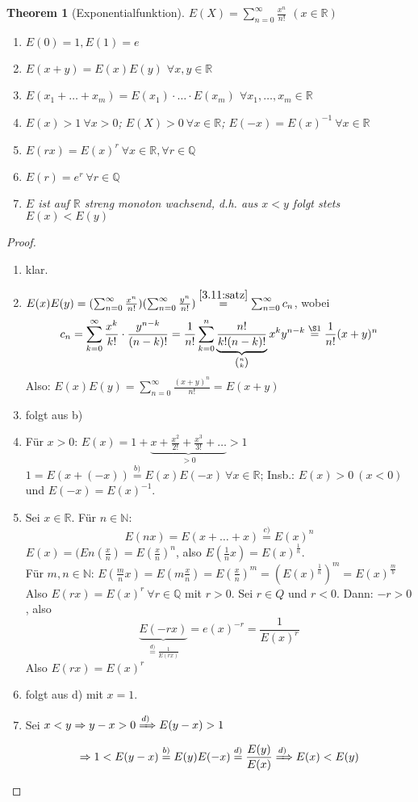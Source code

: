 \documentclass[14pt,titlepage,ngerman,a4paper,headsepline,DIV15,halfparskip*]{scrartcl}
\newcommand{\N}{\mathbb{N}}
\newcommand{\Q}{\mathbb{Q}}
\newcommand{\R}{\mathbb{R}}
\theoremstyle{named}
\newtheorem{namedtheorem}{Theorem} \counterwithin{namedtheorem}{section}
\theoremstyle{dotless}
\begin{document}
\begin{namedtheorem}[Exponentialfunktion] \label{3.12:prop-Exponentialfunktion}
	$E(X) = \sum_{n=0}^{\infty} \frac{x^{n}}{n!}$ $(x \in \R)$
	\begin{enumerate}
		\item $E(0) = 1, E(1) = e$
		\item $E(x + y) = E(x) E(y)$ $\forall x, y \in \R$
		\item $E(x_{1} + \dotsc + x_{m}) = E(x_{1}) \cdot \dotsc \cdot E(x_{m})$ $\forall x_{1}, \dotsc, x_{m} \in \R$
		\item $E(x) > 1 ~\forall x > 0$; $E(X) > 0 ~\forall x \in \R$; $E(-x) = E(x)^{-1} ~\forall x \in \R$
		\item $E(rx) = E(x)^{r} ~\forall x \in \R, \forall r \in \Q$
		\item $E(r) = e^{r} ~\forall r \in \Q$
		\item $E$ ist auf $\R$ streng monoton wachsend, d.h. aus $x < y$ folgt stets $E(x) < E(y)$
	\end{enumerate}	
\end{namedtheorem}

\begin{proof} ~\
	\begin{enumerate}
		\item klar.
		\item $E(x)E(y) = (\sum_{n=0}^{\infty} \frac{x^{n}}{n!})(\sum_{n=0}^{\infty} \frac{y^{n}}{n!}) \overset{\ref{3.11:satz}}{=} \sum_{n=0}^{\infty} c_{n}$, wobei
			$$ c_{n} = \sum_{k=0}^{\infty} \frac{x^{k}}{k!} \cdot \frac{y^{n-k}}{(n-k)!} = \frac{1}{n!} \sum_{k=0}^{n} \underbrace{\frac{n!}{k! (n-k)!}}_{\binom{n}{k}} x^{k} y^{n-k} \overset{\S1}{=} \frac{1}{n!} (x+y)^{n} $$
			Also: $E(x)E(y) = \sum_{n=0}^{\infty} \frac{(x+y)^{n}}{n!} = E(x+y)$
		\item folgt aus b)
		\item Für $x > 0$: $E(x) = 1 + \underbrace{x + \frac{x^{2}}{2!} + \frac{x^{3}}{3!} + \dotsc}_{> 0} > 1$ \\
			$1 = E\left(x + (-x)\right) \overset{b)}{=} E(x) E(-x) ~\forall x \in \R$; Insb.: $E(x) > 0 ~(x < 0)$ und $E(-x) = E(x)^{-1}$.
		\item Sei $x \in \R$. Für $n \in \N$:
			$$ E(nx) = E(x + \dotsc + x) \overset{c)}{=} E(x)^{n} $$
			$E(x) = (E n(\frac{x}{n}) = E(\frac{x}{n})^{n}$, also $E(\frac{1}{n} x) = E(x)^{\frac{1}{n}}$. \\
			Für $m, n \in \N$:
			$E(\frac{m}{n} x) = E(m \frac{x}{n}) = E(\frac{x}{n})^{m} = (E(x)^{\frac{1}{n}})^{m} = E(x)^{\frac{m}{b}}$
			Also $E(rx) = E(x)^{r} ~\forall r \in \Q$ mit $r > 0$. Sei $r \in Q$ und $r < 0$. Dann: $-r > 0$, also
			$$ \underbrace{E(-rx)}_{\overset{d)}{=} \frac{1}{E(rx)}} =e(x)^{-r} = \frac{1}{E(x)^{r}} $$
			Also $E(rx) = E(x)^{r}$
		\item folgt aus d) mit $x = 1$.
		\item Sei $x < y \Rightarrow y - x > 0 \xRightarrow[]{d)} E(y - x) > 1$
			$$ \Rightarrow 1 < E(y - x) \overset{b)}{=} E(y)E(-x) \overset{d)}{=} \frac{E(y)}{E(x)} \xRightarrow[]{d)} E(x) < E(y) $$
	\end{enumerate}
\end{proof}
\end{document}
